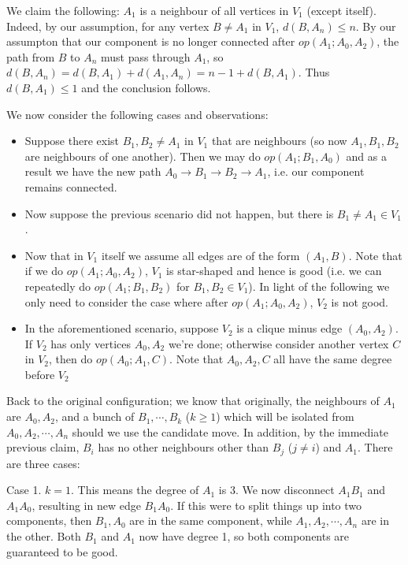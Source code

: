 \documentclass[11pt,a4paper]{article}
\begin{document}
\begin{enumerate}
	We claim the following: $A_1$ is a neighbour of all vertices in $V_1$ (except itself). 
	Indeed, by our assumption, for any vertex $B\neq A_1$ in $V_1$, $d(B, A_n) \le n$. 
	By our assumpton that our component is no longer connected after $op(A_1; A_0, A_2)$, 
	the path from $B$ to $A_n$ must pass through $A_1$, so $d(B, A_n)=d(B, A_1)+d(A_1, A_n)=n - 1 + d(B, A_1)$. 
	Thus $d(B, A_1)\le 1$ and the conclusion follows. 
	
	We now consider the following cases and observations: 
	\begin{itemize}
		\item Suppose there exist $B_1, B_2\neq A_1$ in $V_1$ that are neighbours (so now $A_1, B_1, B_2$ are neighbours of one another). 
		Then we may do $op(A_1; B_1, A_0)$ and as a result we have the new path $A_0\to B_1 \to B_2 \to A_1$, i.e. our component remains connected. 
		
		\item Now suppose the previous scenario did not happen, but there is $B_1\neq A_1\in V_1$. 
		
		\item Now that in $V_1$ itself we assume all edges are of the form $(A_1, B)$. Note that if we do $op(A_1; A_0, A_2)$, $V_1$ is star-shaped and hence is good (i.e. we can repeatedly do $op(A_1; B_1, B_2)$ for $B_1, B_2\in V_1$). 
		In light of the following we only need to consider the case where after $op(A_1; A_0, A_2)$, $V_2$ is not good. 
		
		\item In the aforementioned scenario, suppose $V_2$ is a clique minus edge $(A_0, A_2)$. 
		If $V_2$ has only vertices $A_0, A_2$ we're done; otherwise consider another vertex $C$ in $V_2$, 
		then do $op(A_0; A_1, C)$. 
		Note that $A_0, A_2, C$ all have the same degree before $V_2$
	\end{itemize}
	
	Back to the original configuration; we know that originally, the neighbours of $A_1$ are $A_0, A_2$, and a bunch of $B_1, \cdots, B_k$ ($k\ge 1$) which will be isolated from $A_0, A_2, \cdots , A_n$ should we use the candidate move. In addition, by the immediate previous claim, $B_i$ has no other neighbours other than $B_j$ ($j\neq i$) and $A_1$. There are three cases:
	
	Case 1. $k=1$. This means the degree of $A_1$ is 3. We now disconnect $A_1B_1$ and $A_1A_0$, resulting in new edge $B_1A_0$. If this were to split things up into two components, then $B_1, A_0$ are in the same component, while $A_1, A_2, \cdots , A_n$ are in the other. Both $B_1$ and $A_1$ now have degree 1, so both components are guaranteed to be good.
	

\end{enumerate}
\end{document}

